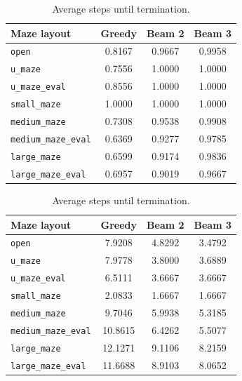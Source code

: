 ﻿\documentclass[12pt,a4paper]{article}
\theoremstyle{definition}
\begin{document}
\begin{table}[H]
\centering
\begin{minipage}[t]{0.49\textwidth}
	\centering
	\caption{Completion rate.}
	\label{tab:completion_rate_all8}
	\scriptsize
	\setlength{\tabcolsep}{3pt}
	\begin{tabular}{lccc}
		\hline
		Maze layout & Greedy & Beam 2 & Beam 3 \\
		\hline
		\texttt{open} & 0.8167 & 0.9667 & 0.9958 \\
		\texttt{u\_maze} & 0.7556 & 1.0000 & 1.0000 \\
		\texttt{u\_maze\_eval} & 0.8556 & 1.0000 & 1.0000 \\
		\texttt{small\_maze} & 1.0000 & 1.0000 & 1.0000 \\
		\texttt{medium\_maze} & 0.7308 & 0.9538 & 0.9908 \\
		\texttt{medium\_maze\_eval} & 0.6369 & 0.9277 & 0.9785 \\
		\texttt{large\_maze} & 0.6599 & 0.9174 & 0.9836 \\
		\texttt{large\_maze\_eval} & 0.6957 & 0.9019 & 0.9667 \\
		\hline
	\end{tabular}
\end{minipage}
\hfill
\begin{minipage}[t]{0.49\textwidth}
	\centering
	\caption{Average steps until termination.}
	\label{tab:avg_steps_all8}
	\scriptsize
	\setlength{\tabcolsep}{3pt}
	\begin{tabular}{lccc}
		\hline
		Maze layout & Greedy & Beam 2 & Beam 3 \\
		\hline
		\texttt{open} & 7.9208 & 4.8292 & 3.4792 \\
		\texttt{u\_maze} & 7.9778 & 3.8000 & 3.6889 \\
		\texttt{u\_maze\_eval} & 6.5111 & 3.6667 & 3.6667 \\
		\texttt{small\_maze} & 2.0833 & 1.6667 & 1.6667 \\
		\texttt{medium\_maze} & 9.7046 & 5.9938 & 5.3185 \\
		\texttt{medium\_maze\_eval} & 10.8615 & 6.4262 & 5.5077 \\
		\texttt{large\_maze} & 12.1271 & 9.1106 & 8.2159 \\
		\texttt{large\_maze\_eval} & 11.6688 & 8.9103 & 8.0652 \\
		\hline
	\end{tabular}
\end{minipage}
\end{table}
\end{document}
